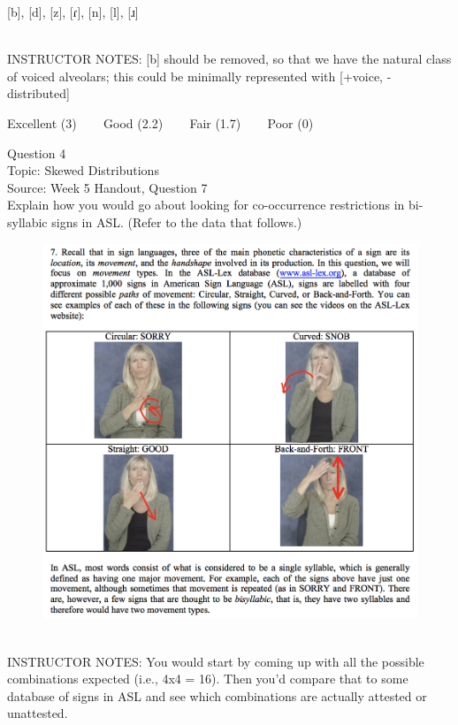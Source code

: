 \documentclass[12pt]{article}
\begin{document}
{[b]}, {[d]}, {[z]}, {[ɾ]}, {[n]}, {[l]}, {[ɹ]}


~\\
INSTRUCTOR NOTES: [b] should be removed, so that we have the natural class of voiced alveolars; this could be minimally represented with [+voice, -distributed]


\vfill
Excellent (3) ~~~ Good (2.2) ~~~ Fair (1.7) ~~~ Poor (0)
\newpage

{\large Question 4}\\

Topic: Skewed Distributions\\
Source: Week 5 Handout, Question 7\\

Explain how you would go about looking for co-occurrence restrictions in bi-syllabic signs in ASL. (Refer to the data that follows.)\\

\begin{figure}[H]
\includegraphics{../images/ASL_movement.png}
\end{figure}

~\\
INSTRUCTOR NOTES: You would start by coming up with all the possible combinations expected (i.e., 4x4 = 16). Then you'd compare that to some database of signs in ASL and see which combinations are actually attested or unattested.
\end{document}
